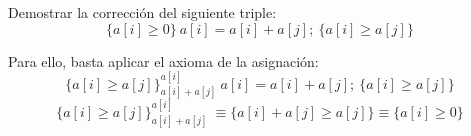 \begin{ejercicio}
    Demostrar la corrección del siguiente triple:
    \begin{equation*}
        \{a[i]\geq 0\}\ a[i]=a[i]+a[j];\ \{a[i]\geq a[j]\}
    \end{equation*}

    Para ello, basta aplicar el axioma de la asignación:
    \begin{equation*}
        \{a[i]\geq a[j]\}_{a[i]+a[j]}^{a[i]}\ a[i]=a[i]+a[j];\ \{a[i]\geq a[j]\}
    \end{equation*}
    \begin{equation*}
        \{a[i]\geq a[j]\}_{a[i]+a[j]}^{a[i]}\ \equiv \{a[i]+a[j]\geq a[j]\} \equiv \{a[i] \geq 0\}
    \end{equation*}
\end{ejercicio}


